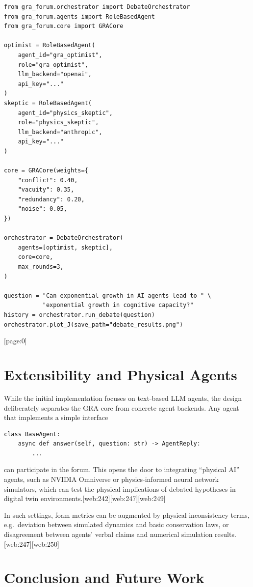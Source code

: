 \documentclass[11pt]{article}
\begin{document}
\begin{verbatim}
from gra_forum.orchestrator import DebateOrchestrator
from gra_forum.agents import RoleBasedAgent
from gra_forum.core import GRACore

optimist = RoleBasedAgent(
    agent_id="gra_optimist",
    role="gra_optimist",
    llm_backend="openai",
    api_key="..."
)
skeptic = RoleBasedAgent(
    agent_id="physics_skeptic",
    role="physics_skeptic",
    llm_backend="anthropic",
    api_key="..."
)

core = GRACore(weights={
    "conflict": 0.40,
    "vacuity": 0.35,
    "redundancy": 0.20,
    "noise": 0.05,
})

orchestrator = DebateOrchestrator(
    agents=[optimist, skeptic],
    core=core,
    max_rounds=3,
)

question = "Can exponential growth in AI agents lead to " \
           "exponential growth in cognitive capacity?"
history = orchestrator.run_debate(question)
orchestrator.plot_J(save_path="debate_results.png")
\end{verbatim}[page:0]

\section{Extensibility and Physical Agents}

While the initial implementation focuses on text-based LLM agents, the design deliberately separates the GRA core from concrete agent backends.
Any agent that implements a simple interface
\begin{verbatim}
class BaseAgent:
    async def answer(self, question: str) -> AgentReply:
        ...
\end{verbatim}
can participate in the forum.
This opens the door to integrating ``physical AI'' agents, such as NVIDIA Omniverse or physics-informed neural network simulators, which can test the physical implications of debated hypotheses in digital twin environments.[web:242][web:247][web:249]

In such settings, foam metrics can be augmented by physical inconsistency terms, e.g.\ deviation between simulated dynamics and basic conservation laws, or disagreement between agents' verbal claims and numerical simulation results.[web:247][web:250]

\section{Conclusion and Future Work}
\end{document}
